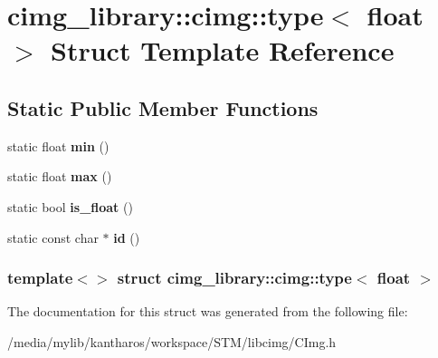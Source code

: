 \hypertarget{structcimg__library_1_1cimg_1_1type_3_01float_01_4}{
\section{cimg\_\-library::cimg::type$<$ float $>$ Struct Template Reference}
\label{structcimg__library_1_1cimg_1_1type_3_01float_01_4}
}
\subsection*{Static Public Member Functions}
\begin{DoxyCompactItemize}
\item 
\hypertarget{structcimg__library_1_1cimg_1_1type_3_01float_01_4_a126d41db37a309041f5f0efe567f088d}{
static float {\bfseries min} ()}
\label{structcimg__library_1_1cimg_1_1type_3_01float_01_4_a126d41db37a309041f5f0efe567f088d}

\item 
\hypertarget{structcimg__library_1_1cimg_1_1type_3_01float_01_4_a57df75d295606e7fa029422cadc95275}{
static float {\bfseries max} ()}
\label{structcimg__library_1_1cimg_1_1type_3_01float_01_4_a57df75d295606e7fa029422cadc95275}

\item 
\hypertarget{structcimg__library_1_1cimg_1_1type_3_01float_01_4_aab9fc168d4a9fc82b39305345d8aaf33}{
static bool {\bfseries is\_\-float} ()}
\label{structcimg__library_1_1cimg_1_1type_3_01float_01_4_aab9fc168d4a9fc82b39305345d8aaf33}

\item 
\hypertarget{structcimg__library_1_1cimg_1_1type_3_01float_01_4_af9a6093d0615b84606953a034416604d}{
static const char $\ast$ {\bfseries id} ()}
\label{structcimg__library_1_1cimg_1_1type_3_01float_01_4_af9a6093d0615b84606953a034416604d}

\end{DoxyCompactItemize}
\subsubsection*{template$<$$>$ struct cimg\_\-library::cimg::type$<$ float $>$}



The documentation for this struct was generated from the following file:\begin{DoxyCompactItemize}
\item 
/media/mylib/kantharos/workspace/STM/libcimg/CImg.h\end{DoxyCompactItemize}
